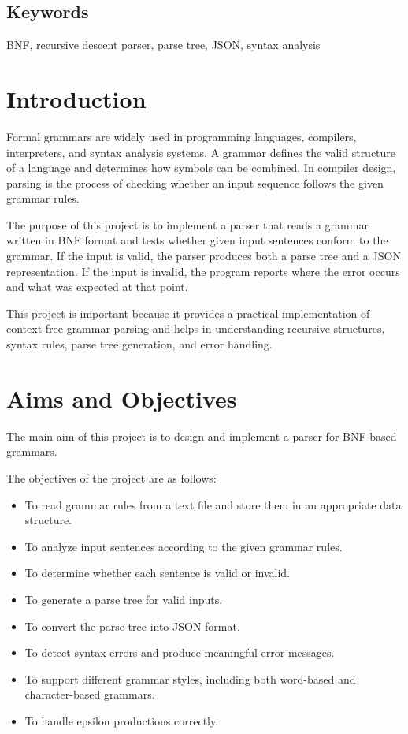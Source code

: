 \documentclass[12pt,a4paper]{article}
\begin{document}
	\subsection*{Keywords}
	BNF, recursive descent parser, parse tree, JSON, syntax analysis
	
	\section{Introduction}
	Formal grammars are widely used in programming languages, compilers, interpreters, and syntax analysis systems. A grammar defines the valid structure of a language and determines how symbols can be combined. In compiler design, parsing is the process of checking whether an input sequence follows the given grammar rules.
	
	The purpose of this project is to implement a parser that reads a grammar written in BNF format and tests whether given input sentences conform to the grammar. If the input is valid, the parser produces both a parse tree and a JSON representation. If the input is invalid, the program reports where the error occurs and what was expected at that point.
	
	This project is important because it provides a practical implementation of context-free grammar parsing and helps in understanding recursive structures, syntax rules, parse tree generation, and error handling.
	
	\section{Aims and Objectives}
	The main aim of this project is to design and implement a parser for BNF-based grammars.
	
	The objectives of the project are as follows:
	\begin{itemize}
		\item To read grammar rules from a text file and store them in an appropriate data structure.
		\item To analyze input sentences according to the given grammar rules.
		\item To determine whether each sentence is valid or invalid.
		\item To generate a parse tree for valid inputs.
		\item To convert the parse tree into JSON format.
		\item To detect syntax errors and produce meaningful error messages.
		\item To support different grammar styles, including both word-based and character-based grammars.
		\item To handle epsilon productions correctly.
	\end{itemize}
	
\end{document}
